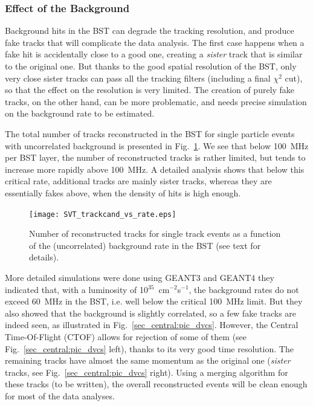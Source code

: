 \subsubsection{Effect of the Background}

Background hits in the BST can degrade the tracking resolution, and produce fake 
tracks that will complicate the data analysis.  The first case happens when a fake 
hit is accidentally close to a good one, creating a \emph{sister} track that is 
similar to the original one.  But thanks to the good spatial resolution of the BST, 
only very close sister tracks can pass all the tracking filters (including a final 
$\chi^2$ cut), so that the effect on the resolution is very limited.  The creation 
of purely fake tracks, on the other hand, can be more problematic, and needs precise 
simulation on the background rate to be estimated.

The total number of tracks reconstructed in the BST for single particle events with 
uncorrelated background is presented in Fig.~\ref{sec_central:pic_background}.  We 
see that below 100~MHz per BST layer, the number of reconstructed tracks is rather 
limited, but tends to increase more rapidly above 100~MHz.  A detailed analysis shows 
that below this critical rate, additional tracks are mainly sister tracks, whereas 
they are essentially fakes above, when the density of hits is high enough.

\begin{figure}[ht!]
\centering
\texttt{[image: SVT\_trackcand\_vs\_rate.eps]}
\caption{\small{Number of reconstructed tracks for single track events as a function 
of the (uncorrelated) background rate in the BST (see text for details).}}
\label{sec_central:pic_background}
\end{figure}

More detailed simulations were done using GEANT3 and GEANT4 they indicated that, 
with a luminosity of 10$^{35}$~cm$^{-2}$s$^{-1}$, the background rates do not 
exceed 60~MHz in the BST, i.e. well below the critical 100~MHz limit.  But they 
also showed that the background is slightly correlated, so a few fake tracks are 
indeed seen, as illustrated in Fig.~\ref{sec_central:pic_dvcs}.  However, the 
Central Time-Of-Flight (CTOF) allows for rejection of some of them (see 
Fig.~\ref{sec_central:pic_dvcs} left), thanks to its very good time resolution.  
The remaining tracks have almost the same momentum as the original one (\emph{sister} 
tracks, see Fig.~\ref{sec_central:pic_dvcs} right).  Using a merging algorithm for 
these tracks (to be written), the overall reconstructed events will be clean enough 
for most of the data analyses.

